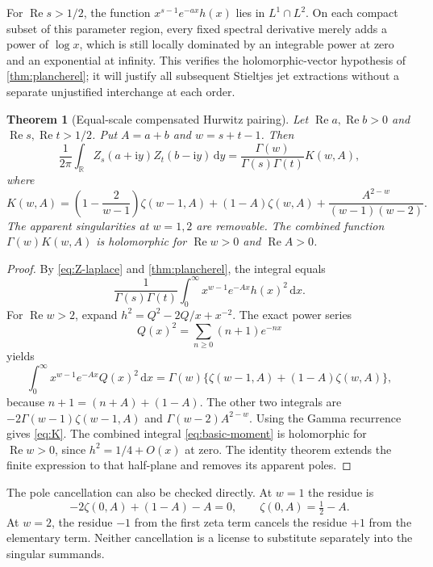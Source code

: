 \documentclass[11pt,a4paper]{article}
\newtheorem{theorem}{Theorem}[section]
\theoremstyle{definition}
\numberwithin{equation}{section}
\newcommand{\R}{\mathbb R}
\newcommand{\Rea}{\operatorname{Re}}
\newcommand{\dd}{\,\mathrm d}
\newcommand{\ii}{\mathrm i}
\begin{document}
For $\Rea s>1/2$, the function $x^{s-1}e^{-ax}h(x)$ lies in
$L^1\cap L^2$. On each compact subset of this parameter region, every
fixed spectral derivative merely adds a power of $\log x$, which is still
locally dominated by an integrable power at zero and an exponential at
infinity. This verifies the holomorphic-vector hypothesis of
\cref{thm:plancherel}; it will justify all subsequent Stieltjes jet
extractions without a separate unjustified interchange at each order.

\begin{theorem}[Equal-scale compensated Hurwitz pairing]\label{thm:basic}
Let $\Rea a,\Rea b>0$ and $\Rea s,\Rea t>1/2$. Put
$A=a+b$ and $w=s+t-1$. Then
\begin{equation}\label{eq:basic-pair}
 \frac1{2\pi}\int_{\R}Z_s(a+\ii y)Z_t(b-\ii y)\dd y
   =\frac{\Gamma(w)}{\Gamma(s)\Gamma(t)}K(w,A),
\end{equation}
where
\begin{equation}\label{eq:K}
 \boxed{\displaystyle
 K(w,A)=\left(1-\frac2{w-1}\right)\zeta(w-1,A)
 +(1-A)\zeta(w,A)
 +\frac{A^{2-w}}{(w-1)(w-2)}.}
\end{equation}
The apparent singularities at $w=1,2$ are removable. The combined function
$\Gamma(w)K(w,A)$ is holomorphic for $\Rea w>0$ and $\Rea A>0$.
\end{theorem}
\begin{proof}
By \eqref{eq:Z-laplace} and \cref{thm:plancherel}, the integral equals
\begin{equation}\label{eq:basic-moment}
 \frac1{\Gamma(s)\Gamma(t)}
   \int_0^\infty x^{w-1}e^{-Ax}h(x)^2\dd x.
\end{equation}
For $\Rea w>2$, expand $h^2=Q^2-2Q/x+x^{-2}$.
The exact power series
\[
 Q(x)^2=\sum_{n\ge0}(n+1)e^{-nx}
\]
yields
\[
 \int_0^\infty x^{w-1}e^{-Ax}Q(x)^2\dd x
 =\Gamma(w)\{\zeta(w-1,A)+(1-A)\zeta(w,A)\},
\]
because $n+1=(n+A)+(1-A)$. The other two integrals are
$-2\Gamma(w-1)\zeta(w-1,A)$ and $\Gamma(w-2)A^{2-w}$.
Using the Gamma recurrence gives \eqref{eq:K}.
The combined integral \eqref{eq:basic-moment} is holomorphic for
$\Rea w>0$, since $h^2=1/4+O(x)$ at zero. The identity theorem extends
the finite expression to that half-plane and removes its apparent poles.
\end{proof}

The pole cancellation can also be checked directly. At $w=1$ the residue
is
\[
 -2\zeta(0,A)+(1-A)-A=0,
 \qquad \zeta(0,A)=\tfrac12-A.
\]
At $w=2$, the residue $-1$ from the first zeta term cancels the residue
$+1$ from the elementary term. Neither cancellation is a license to
substitute separately into the singular summands.
\end{document}
